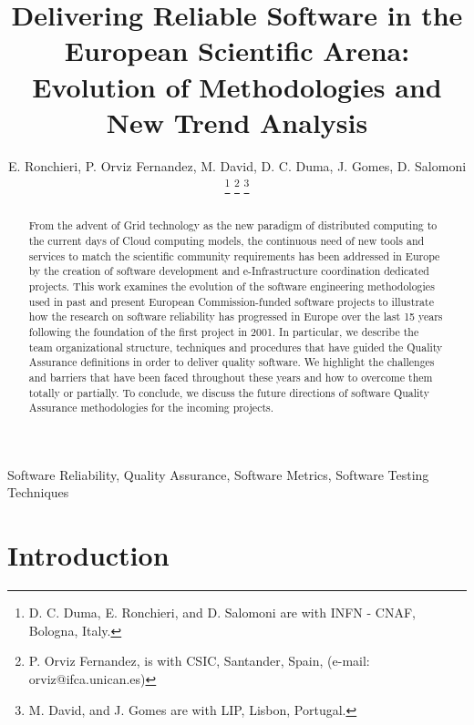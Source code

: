 \documentclass[journal]{IEEEtran}
\begin{document}
\title{Delivering Reliable Software in the European Scientific Arena: Evolution of Methodologies and New Trend Analysis}

\author{E. Ronchieri,
        P. Orviz Fernandez,
        M. David,
		D. C. Duma,
        J. Gomes,
        D. Salomoni
\thanks{D. C. Duma, E. Ronchieri, and D. Salomoni are with INFN - CNAF, Bologna, Italy.}
\thanks{P. Orviz Fernandez, is with CSIC, Santander, Spain, (e-mail: orviz@ifca.unican.es)}
\thanks{M. David, and J. Gomes are with LIP, Lisbon, Portugal.}%
}


\maketitle

\begin{abstract}
From the advent of Grid technology as the new paradigm of distributed
computing to the current days of Cloud computing models, the continuous need
of new tools and services to match the scientific community requirements has been
addressed in Europe by the creation of software development and
e-Infrastructure coordination dedicated projects. This work examines the
evolution of the software engineering methodologies used in past and present
European Commission-funded software projects to illustrate how the research on software
reliability has progressed in Europe over the last 15 years following the
foundation of the first project in 2001. In particular, we describe the team
organizational structure, techniques and procedures that have guided the Quality
Assurance definitions in order to deliver quality software. We highlight the challenges
and barriers that have been faced throughout these years and how to overcome them totally or
partially. To conclude, we discuss the future directions of software
Quality Assurance methodologies for the incoming projects.
\end{abstract}

\begin{IEEEkeywords}
Software Reliability, Quality Assurance, Software Metrics, Software Testing
Techniques
\end{IEEEkeywords}

\IEEEpeerreviewmaketitle

\section{Introduction}
\end{document}
